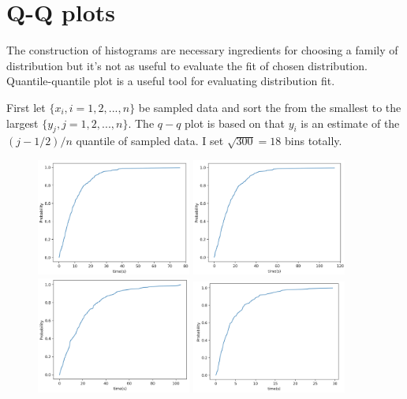 \documentclass{article}
\begin{document}
\section{Q-Q plots}

The construction of histograms are necessary ingredients for choosing a family of distribution but it's not as useful to evaluate the fit of chosen distribution. Quantile-quantile plot is a useful tool for evaluating distribution fit.

First let ${\{x_i, i=1,2,...,n\}}$ be sampled data and sort the from the smallest to the largest ${\{y_j, j=1,2,...,n\}}$. The $q-q$ plot is based on that $y_i$ is an estimate of the $(j-1/2)/n$ quantile of sampled data. I set $\sqrt{300} = 18$ bins totally.

\begin{figure}[htbp]
\begin{center}
\includegraphics[width=2in]{cdf1.png}
\includegraphics[width=2in]{cdf2.png}
\includegraphics[width=2in]{cdf3.png}
\includegraphics[width=2in]{cdf4.png}

\end{center}
\end{figure}
\end{document}
